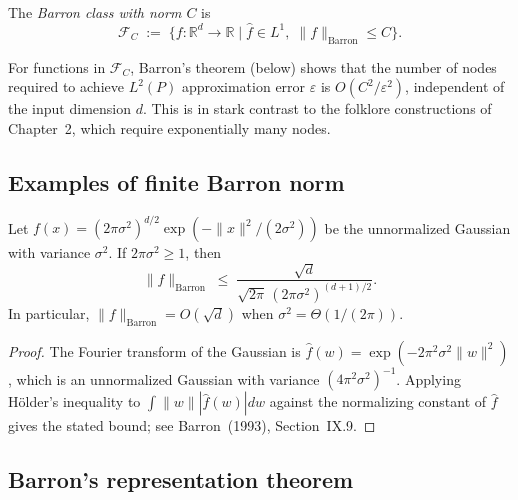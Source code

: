 \begin{definition}\label{def:barronClass}
The \emph{Barron class with norm $C$} is
\[
  \mathcal{F}_C \;:=\; \bigl\{f : \mathbb{R}^d \to \mathbb{R}
    \;\big|\; \widehat{f} \in L^1,\; \|f\|_{\mathrm{Barron}} \le C\bigr\}.
\]
\end{definition}

\begin{remark}\label{rem:barronNormDimensionFree}
  For functions in $\mathcal{F}_C$, Barron's theorem (below) shows that the number of
  nodes required to achieve $L^2(P)$ approximation error $\varepsilon$ is $O(C^2/\varepsilon^2)$,
  independent of the input dimension $d$.
  This is in stark contrast to the folklore constructions of Chapter~2, which require
  exponentially many nodes.
\end{remark}

\subsection{Examples of finite Barron norm}

\begin{proposition}\label{prop:gaussianBarronNorm}
Let $f(x) = (2\pi\sigma^2)^{d/2}\exp(-\|x\|^2/(2\sigma^2))$ be the unnormalized Gaussian
with variance $\sigma^2$.  If $2\pi\sigma^2 \ge 1$, then
\[
  \|f\|_{\mathrm{Barron}}
  \;\le\; \frac{\sqrt{d}}{\sqrt{2\pi}\,(2\pi\sigma^2)^{(d+1)/2}}.
\]
In particular, $\|f\|_{\mathrm{Barron}} = O(\sqrt{d})$ when $\sigma^2 = \Theta(1/(2\pi))$.
\end{proposition}

\begin{proof}
The Fourier transform of the Gaussian is
$\widehat{f}(w) = \exp(-2\pi^2 \sigma^2 \|w\|^2)$,
which is an unnormalized Gaussian with variance $(4\pi^2 \sigma^2)^{-1}$.
Applying Hölder's inequality to $\int \|w\| |\widehat{f}(w)| dw$ against the normalizing
constant of $\widehat{f}$ gives the stated bound; see Barron~(1993), Section~IX.9.
\end{proof}

\subsection{Barron's representation theorem}

